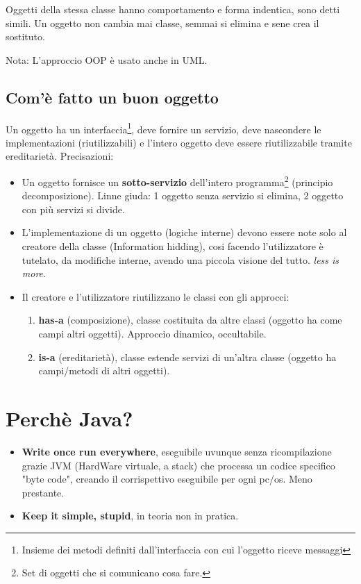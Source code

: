 Oggetti della stessa classe hanno comportamento e forma indentica, sono detti simili.
Un oggetto non cambia mai classe, semmai si elimina e sene crea il sostituto.

Nota: L'approccio OOP è usato anche in UML.

\subsection{Com'è fatto un buon oggetto}
Un oggetto ha un interfaccia\footnote{Insieme dei metodi definiti dall'interfaccia con cui l'oggetto riceve messaggi}, deve fornire un servizio, deve nascondere le implementazioni (riutilizzabili) e l'intero oggetto deve essere riutilizzabile tramite ereditarietà. Precisazioni:
\begin{itemize}
	\item Un oggetto fornisce un \textbf{sotto-servizio} dell'intero programma\footnote{Set di oggetti che si comunicano cosa fare.} (principio decomposizione). Linne giuda: 1 oggetto senza servizio si elimina, 2 oggetto con più servizi si divide.

	\item L'implementazione di un oggetto (logiche interne) devono essere note solo al creatore della classe (Information hidding), cosi facendo l'utilizzatore è tutelato, da modifiche interne, avendo una piccola visione del tutto. \textit{less is more}.

	\item Il creatore e l'utilizzatore riutilizzano le classi con gli approcci:
	\begin{enumerate}
		\item \textbf{has-a} (composizione), classe costituita da altre classi (oggetto ha come campi altri oggetti). Approccio dinamico, occultabile.
		\item \textbf{is-a} (ereditarietà), classe estende servizi di un'altra classe (oggetto ha campi/metodi di altri oggetti).
	\end{enumerate}
\end{itemize}

\section{Perchè Java?}
\begin{itemize}
	\item \textbf{Write once run everywhere}, eseguibile uvunque senza ricompilazione grazie JVM (HardWare virtuale, a stack) che processa un codice specifico "byte code", creando il corrispettivo eseguibile per ogni pc/os. Meno prestante.

	\item \textbf{Keep it simple, stupid}, in teoria non in pratica.
\end{itemize}

